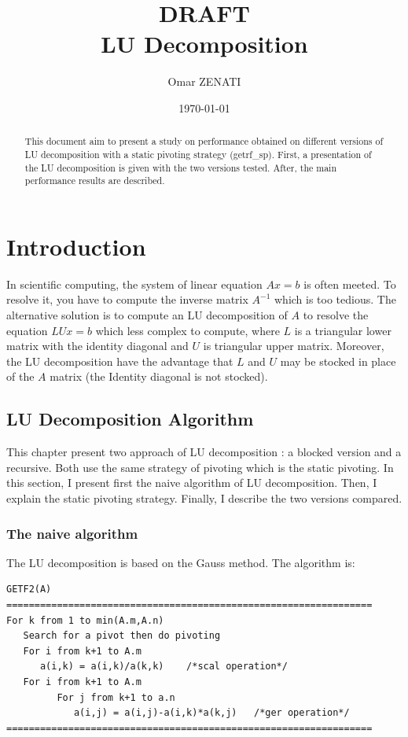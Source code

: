 \documentclass{report}
\title{\Huge{\textbf{DRAFT}}\\
\Huge{LU Decomposition}}
\author{Omar ZENATI}
\date{\today}
\begin{document}
\maketitle
\begin{abstract}
This document aim to present a study on performance obtained on different versions of LU decomposition with a static pivoting strategy (getrf\_sp). First, a presentation of the LU decomposition is given with the two versions tested. After, the main performance results are described.
\end{abstract}
\tableofcontents

\chapter{Introduction}

In scientific computing, the system of linear equation $Ax = b$ is often meeted. To resolve it, you have to compute the inverse matrix $A^{-1}$ which is too tedious. The alternative solution is to compute an LU decomposition of $A$ to resolve the equation $LUx = b$ which less complex to compute, where $L$ is a triangular lower matrix with the identity diagonal and $U$ is triangular upper matrix. Moreover, the LU decomposition have the advantage that $L$ and $U$ may be stocked in place of the $A$ matrix (the Identity diagonal is not stocked).

\section{LU Decomposition Algorithm}
This chapter present two approach of LU decomposition : a blocked version and a recursive. Both use the same strategy of pivoting which is the static pivoting. In this section, I present first the naive algorithm of LU decomposition. Then, I explain the static pivoting strategy. Finally, I describe the two versions compared.

\subsection{The naive algorithm}
The LU decomposition is based on the Gauss method. The algorithm is:
\begin{verbatim}
GETF2(A)
=================================================================
For k from 1 to min(A.m,A.n)
   Search for a pivot then do pivoting
   For i from k+1 to A.m
      a(i,k) = a(i,k)/a(k,k)    /*scal operation*/
   For i from k+1 to A.m
         For j from k+1 to a.n
            a(i,j) = a(i,j)-a(i,k)*a(k,j)   /*ger operation*/
=================================================================
\end{verbatim} 
\end{document}
